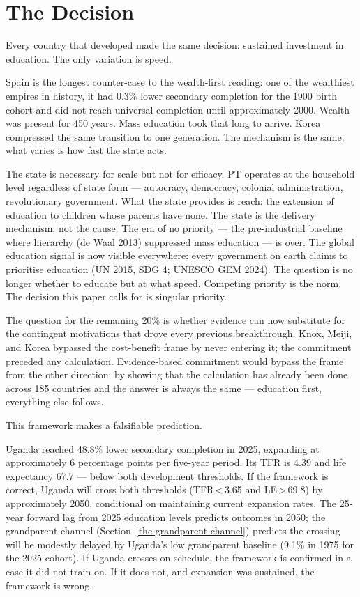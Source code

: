 \documentclass[12pt,letterpaper]{article}
\begin{document}
\section{The Decision}\label{the-decision}

Every country that developed made the same decision: sustained investment in education. The only variation is speed.

Spain is the longest counter-case to the wealth-first reading: one of the wealthiest empires in
history, it had 0.3\% lower secondary completion for the 1900 birth
cohort and did not reach universal completion until approximately 2000.
Wealth was present for 450 years. Mass education took that long to
arrive. Korea compressed the same transition to one generation. The
mechanism is the same; what varies is how fast the state acts.

The state is necessary for scale but not for efficacy. PT operates at
the household level regardless of state form --- autocracy, democracy,
colonial administration, revolutionary government. What the state
provides is reach: the extension of education to children whose parents
have none. The state is the delivery mechanism, not the cause. The era
of no priority --- the pre-industrial baseline where hierarchy
(de Waal 2013) suppressed mass education --- is over. The global education signal is
now visible everywhere: every government on earth claims to prioritise
education (UN 2015, SDG 4; UNESCO GEM 2024). The question is no longer
whether to educate but at what speed. Competing priority is the norm. The decision this paper calls for
is singular priority.

The question for the remaining 20\% is whether evidence can now
substitute for the contingent motivations that drove every previous
breakthrough. Knox, Meiji, and Korea bypassed the cost-benefit frame by
never entering it; the commitment preceded any calculation.
Evidence-based commitment would bypass the frame from the other
direction: by showing that the calculation has already been done across
185 countries and the answer is always the same --- education first,
everything else follows.

This framework makes a falsifiable prediction.

Uganda reached 48.8\%
lower secondary completion in 2025, expanding at approximately 6
percentage points per five-year period. Its TFR is 4.39 and life
expectancy 67.7 --- below both development thresholds. If the framework
is correct, Uganda will cross both thresholds (TFR\,<\,3.65 and
LE\,>\,69.8) by approximately 2050, conditional on maintaining current
expansion rates. The 25-year forward lag from 2025 education levels
predicts outcomes in 2050; the grandparent channel
(Section~\ref{the-grandparent-channel}) predicts the crossing will be
modestly delayed by Uganda's low grandparent baseline (9.1\% in 1975
for the 2025 cohort). If Uganda crosses on schedule, the framework is
confirmed in a case it did not train on. If it does not, and expansion
was sustained, the framework is wrong.
\end{document}
